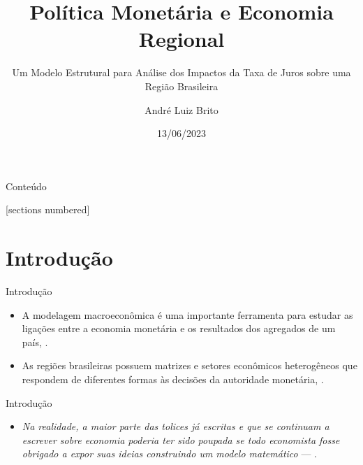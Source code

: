 \documentclass[10pt]{beamer}
\title{Política Monetária e Economia Regional}
\subtitle{Um Modelo Estrutural para Análise dos Impactos 
	da Taxa de Juros sobre uma Região Brasileira}
\author{André Luiz Brito}
\institute{PPGDE-UFPR}
\date{13/06/2023}
\let\olditem\item
\renewcommand{\item}{%
	\olditem\vspace{5pt}}
\begin{document}
	
\begin{frame}
		
\maketitle
		
\end{frame}
	
	
\begin{frame}{Conteúdo}
		
[sections numbered]
\tableofcontents[hideallsubsections]
		
\end{frame}
	
	
\section{Introdução}
	
	
\begin{frame}{Introdução}
		
\begin{itemize}
	\item A modelagem macroeconômica é uma importante ferramenta para estudar as ligações entre a economia monetária e os resultados dos agregados de um país, \textcite{gali_monetary_2015}.
	\item As regiões brasileiras possuem matrizes e setores econômicos heterogêneos que respondem de diferentes formas às decisões da autoridade monetária, \textcite{bertanha_efeitos_2008}.
\end{itemize}

\end{frame}
	

\begin{frame}{Introdução}
	
	\begin{itemize}
		\item \textit{Na realidade, a maior parte das tolices já escritas e que se continuam a escrever sobre economia poderia ter sido poupada se todo economista fosse obrigado a expor suas ideias construindo um modelo matemático} --- \textcite[p.68]{simonsen_microeconomia_1979}.
	\end{itemize}
	
\end{frame}
\end{document}
